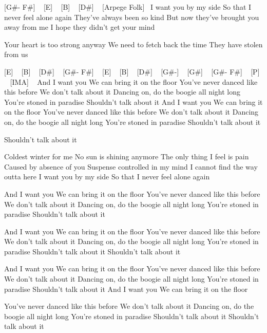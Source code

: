 

[G#- F#] ~  [E] ~ [B] ~ [D#] ~
[Arpege Folk]~
I want you by my side
So that I never feel alone again
They've always been so kind
But now they've brought you away from me
I hope they didn't get your mind

Your heart is too strong anyway
We need to fetch back the time
They have stolen from us

[E] ~ [B] ~ [D#] ~ [G#- F#] ~
[E] ~ [B] ~ [D#] ~ [G#-] ~
[G#] ~ [G#- F#] ~
[P] ~ [IMA] ~
And I want you
We can bring it on the floor
You've never danced like this before
We don't talk about it
Dancing on, do the boogie all night long
You're stoned in paradise
Shouldn't talk about it
And I want you
We can bring it on the floor
You've never danced like this before
We don't talk about it
Dancing on, do the boogie all night long
You're stoned in paradise
Shouldn't talk about it

Shouldn't talk about it

Coldest winter for me
No sun is shining anymore
The only thing I feel is pain
Caused by absence of you
Suspense controlled in my mind
I cannot find the way outta here
I want you by my side
So that I never feel alone again

And I want you
We can bring it on the floor
You've never danced like this before
We don't talk about it
Dancing on, do the boogie all night long
You're stoned in paradise
Shouldn't talk about it

And I want you
We can bring it on the floor
You've never danced like this before
We don't talk about it
Dancing on, do the boogie all night long
You're stoned in paradise
Shouldn't talk about it
Shouldn't talk about it

And I want you
We can bring it on the floor
You've never danced like this before
We don't talk about it
Dancing on, do the boogie all night long
You're stoned in paradise
Shouldn't talk about it
And I want you
We can bring it on the floor

You've never danced like this before
We don't talk about it
Dancing on, do the boogie all night long
You're stoned in paradise
Shouldn't talk about it
Shouldn't talk about it
